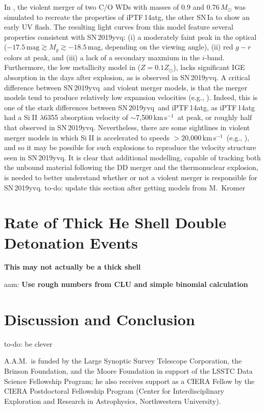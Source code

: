 \documentclass[twocolumn]{aastex63}
\def\ion#1#2{#1$\;${\footnotesize\rm{#2}}\relax}
\newcommand{\aam}[1]{{\color{DarkOrange} aam: \textbf{#1}}}
\newcommand{\todo}[1]{{\color{magenta} to-do: {#1}}}
\newcommand{\kms}{km\,s$^{-1}$}
\newcommand{\sn}{SN\,2019yvq}
\begin{document}
In \citet{Kromer16}, the violent merger of two C/O WDs with masses of 0.9 and
0.76\,$M_\odot$ was simulated to recreate the properties of iPTF\,14atg, the
other SN\,Ia to show an early UV flash. The resulting light curves from this
model feature several properties consistent with \sn: (i) a moderately faint
peak in the optical ($-17.5\,\mathrm{mag} \gtrsim M_g \gtrsim -18.5$\,mag,
depending on the viewing angle), (ii) red $g - r$ colors at peak, and (iii) a
lack of a secondary maxmium in the $i$-band. Furthermore, the low metallicity
model in \citet{Kromer16} ($Z = 0.1 Z_\odot$), lacks significant IGE
absorption in the days after explosion, as is observed in \sn. A critical
difference between \sn\ and violent merger models, is that the merger models
tend to produce relatively low expansion velocities (e.g.,
\citealt{Pakmor10,Kromer13a,Kromer16}). Indeed, this is one of the stark
differences between \sn\ and iPTF\,14atg, as iPTF\,14atg had a \ion{Si}{II}
$\lambda$6355 absorption velocity of $\sim$7,500\,\kms\ at peak, or roughly
half that observed in \sn. Nevertheless, there are some sightlines in violent
merger models in which \ion{Si}{II} is accelerated to speeds $> 20$,000\,\kms\
(e.g., \citealt{Kromer13}), and so it may be possible for such explosions to
reproduce the velocity structure seen in \sn. It is clear that additional
modelling, capable of tracking both the unbound material following the DD
merger and the thermonuclear explosion, is needed to better understand whether
or not a violent merger is responsible for \sn. \todo{update this section
after getting models from M.~Kromer}

\section{Rate of Thick He Shell Double Detonation Events}\label{sec:rates}

\textbf{This may not actually be a thick shell}

\aam{Use rough numbers from CLU and simple binomial calculation}

\section{Discussion and Conclusion}\label{sec:conclusions}

\todo{be clever}

\acknowledgements

A.A.M.~is funded by the Large Synoptic Survey Telescope Corporation, the
Brinson Foundation, and the Moore Foundation in support of the LSSTC Data
Science Fellowship Program; he also receives support as a CIERA Fellow by the
CIERA Postdoctoral Fellowship Program (Center for Interdisciplinary
Exploration and Research in Astrophysics, Northwestern University).
\end{document}
